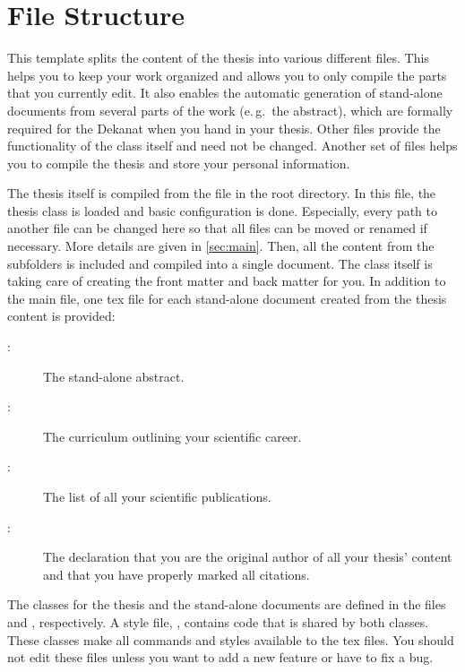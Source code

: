 \section{File Structure}
This template splits the content of the thesis into various different files.
This helps you to keep your work organized and allows you to only compile the
parts that you currently edit. It also enables the automatic generation of
stand-alone documents from several parts of the work (e.\,g.\ the abstract),
which are formally required for the Dekanat when you hand in your thesis.
Other files provide the functionality of the class itself and need not be
changed.  Another set of files helps you to compile the thesis and store your
personal information.

The thesis itself is compiled from the file  in the root
directory. In this file, the thesis class is loaded and basic configuration is
done. Especially, every path to another file can be changed here so that all
files can be moved or renamed if necessary. More details are given in
\autoref{sec:main}. Then, all the content from the subfolders is included and
compiled into a single document. The class itself is taking care of creating
the front matter and back matter for you. In addition to the main file, one
tex file for each stand-alone document created from the thesis content is
provided:
\begin{description}
    \item[:]
        The stand-alone abstract.
    \item[:]
        The curriculum outlining your scientific career.
    \item[:]
        The list of all your scientific publications.
    \item[:]
        The declaration that you are the original author of all your thesis'
        content and that you have properly marked all citations.
\end{description}

The classes for the thesis and the stand-alone documents are defined in the
files  and
, respectively. A style file,
, contains code that is shared by
both classes.  These classes make all commands and styles available to the tex
files. You should not edit these files unless you want to add a new feature or
have to fix a bug.

